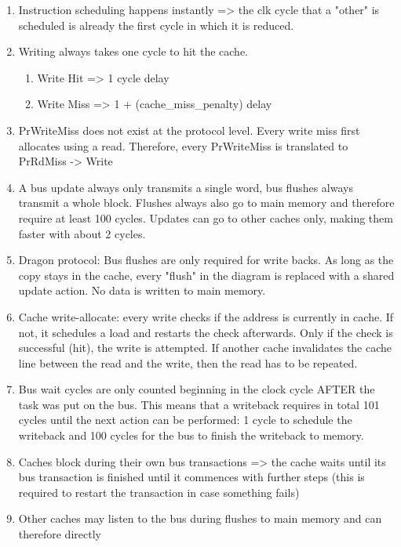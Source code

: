 \begin{enumerate}
    \item Instruction scheduling happens instantly => the clk cycle that a "other" is scheduled is
          already the first cycle in which it is reduced.
    \item Writing always takes one cycle to hit the cache.
          \begin{enumerate}
              \item Write Hit => 1 cycle delay
              \item Write Miss => 1 + (cache\_miss\_penalty) delay
          \end{enumerate}
    \item PrWriteMiss does not exist at the protocol level. Every write miss first allocates using a
          read. Therefore, every PrWriteMiss is translated to PrRdMiss -> Write
    \item A bus update always only transmits a single word, bus flushes always transmit a whole block.
          Flushes always also go to main memory and therefore require at least 100 cycles. Updates can go to
          other caches only, making them faster with about 2 cycles.
    \item Dragon protocol: Bus flushes are only required for write backs. As long as the copy stays in
          the cache, every "flush" in the diagram is replaced with a shared update action. No data is written
          to main memory.
    \item Cache write-allocate: every write checks if the address is currently in cache. If not, it
          schedules a load and restarts the check afterwards. Only if the check is successful (hit), the write
          is attempted. If another cache invalidates the cache line between the read and the write, then the
          read has to be repeated.
    \item Bus wait cycles are only counted beginning in the clock cycle AFTER the task was put on the
          bus. This means that a writeback requires in total 101 cycles until the next action can be
          performed: 1 cycle to schedule the writeback and 100 cycles for the bus to finish the writeback to
          memory.
    \item Caches block during their own bus transactions => the cache waits until its bus transaction is
          finished until it commences with further steps (this is required to restart the transaction in case
          something fails)
    \item Other caches may listen to the bus during flushes to main memory and can therefore directly

\end{enumerate}
